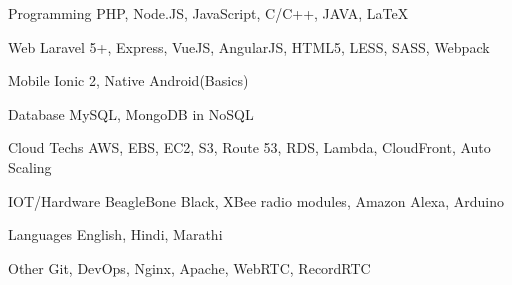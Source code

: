 

\begin{cvskills}

  \cvskill
    {Programming} %
    {PHP, Node.JS, JavaScript, C/C++, JAVA, LaTeX} %

  \cvskill
    {Web} %
    {Laravel 5+, Express, VueJS, AngularJS, HTML5, LESS, SASS, Webpack} %
    
  \cvskill
    {Mobile} %
    {Ionic 2, Native Android(Basics)} %

  \cvskill
    {Database} %
    {MySQL, MongoDB in NoSQL} %

  \cvskill
    {Cloud Techs} %
    {AWS, EBS, EC2, S3, Route 53, RDS, Lambda, CloudFront, Auto Scaling} %

  \cvskill
    {IOT/Hardware} %
    {BeagleBone Black, XBee radio modules, Amazon Alexa, Arduino} %

  \cvskill
    {Languages} %
    {English, Hindi, Marathi} %
    
  \cvskill
    {Other} %
    {Git, DevOps, Nginx, Apache, WebRTC, RecordRTC} %
        
    
\end{cvskills}
